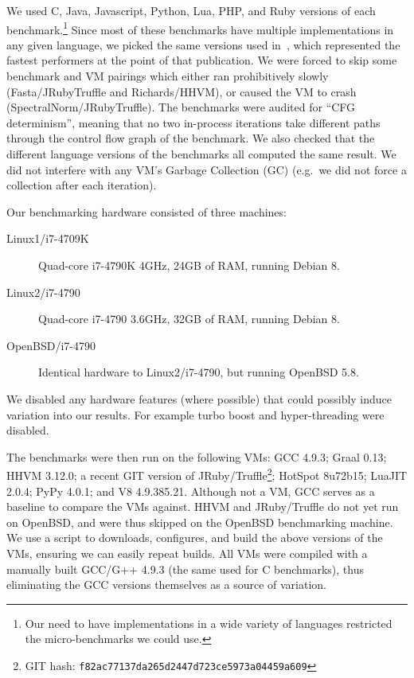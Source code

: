 \documentclass[preprint]{sigplanconf}
\newcommand{\bencherthree}{Linux1/i7-4709K\xspace}
\newcommand{\bencherfive}{Linux2/i7-4790\xspace}
\newcommand{\benchersix}{OpenBSD/i7-4790\xspace}
\begin{document}
We used C, Java, Javascript, Python, Lua, PHP,
and Ruby versions of each benchmark.\footnote{Our need to have implementations in a wide variety
of languages restricted the micro-benchmarks we could use.} Since most of these
benchmarks have multiple implementations in any given language, we picked
the same versions used in~\cite{bolz14impact}, which represented the fastest
performers at the point of that publication. We were forced to skip some
benchmark and VM pairings which either ran prohibitively slowly
(Fasta/JRubyTruffle and Richards/HHVM), or caused the VM to crash
(SpectralNorm/JRubyTruffle). The benchmarks were audited for ``CFG
determinism'', meaning that no two in-process iterations take different paths
through the control flow graph of the benchmark. We also checked that the
different language versions of the benchmarks all computed the same result.
We did not interfere with any VM's Garbage
Collection (GC) (e.g.~we did not force a collection after each iteration).

Our benchmarking hardware consisted of three machines:

\begin{description}
\item[\bencherthree] Quad-core i7-4790K 4GHz, 24GB of RAM, running Debian 8.
\item[\bencherfive] Quad-core i7-4790 3.6GHz, 32GB of RAM, running Debian 8.
\item[\benchersix] Identical hardware to \bencherfive, but running OpenBSD 5.8.
\end{description}

\noindent We disabled any hardware features (where possible) that could
possibly induce variation into our results. For example turbo boost and
hyper-threading were disabled.

The benchmarks were then run on the following VMs: GCC 4.9.3; Graal 0.13;
HHVM 3.12.0; a recent GIT version of JRuby/Truffle\footnote{GIT
hash: \texttt{f82ac77137da265d2447d723ce5973a04459a609}}; HotSpot 8u72b15;
LuaJIT 2.0.4; PyPy 4.0.1; and V8 4.9.385.21. Although not a VM, GCC serves as a
baseline to compare the VMs against. HHVM and JRuby/Truffle do not yet run on
OpenBSD, and were thus skipped on the OpenBSD benchmarking machine.
We use a script to downloads, configures, and build the above
versions of the VMs, ensuring we can easily repeat builds. All VMs were
compiled with a manually built GCC/G++ 4.9.3 (the same used for C benchmarks),
thus eliminating the GCC versions themselves as a source of variation.
\end{document}
